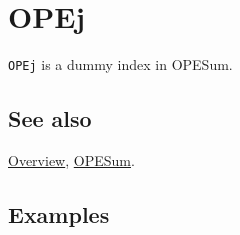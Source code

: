 \documentclass[../FeynCalcManual.tex]{subfiles}
\begin{document}
\hypertarget{opej}{%
\section{OPEj}\label{opej}}

\texttt{OPEj} is a dummy index in OPESum.

\subsection{See also}

\hyperlink{toc}{Overview}, \hyperlink{opesum}{OPESum}.

\subsection{Examples}
\end{document}
